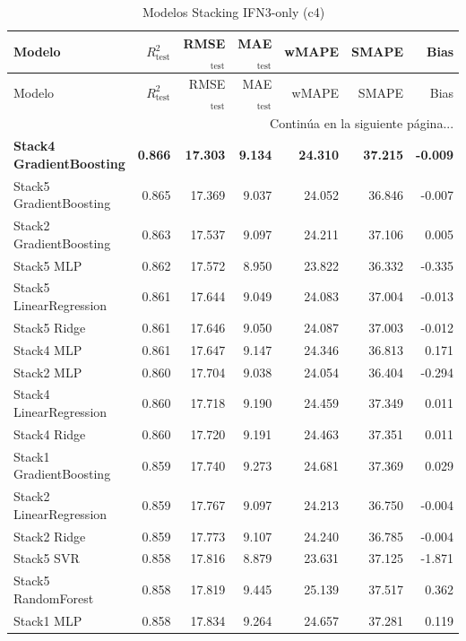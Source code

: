 \begin{longtable}{lrrrrrr}
    \caption{Modelos Stacking IFN3-only (c4)}
    \label{tab:stack_ifn3_c4} \\
    \toprule
    Modelo & $R^2_{\text{test}}$ & RMSE$_{\text{test}}$ & MAE$_{\text{test}}$ & wMAPE & SMAPE & Bias \\
    \midrule
    \endfirsthead
    \toprule
    Modelo & $R^2_{\text{test}}$ & RMSE$_{\text{test}}$ & MAE$_{\text{test}}$ & wMAPE & SMAPE & Bias \\
    \midrule
    \endhead
    \midrule
    \multicolumn{7}{r}{{Continúa en la siguiente página...}} \\
    \endfoot
    \bottomrule
    \endlastfoot
    \textbf{Stack4 GradientBoosting} & \textbf{0.866} & \textbf{17.303} & \textbf{9.134} & \textbf{24.310} & \textbf{37.215} & \textbf{-0.009} \\
    Stack5 GradientBoosting & 0.865 & 17.369 & 9.037 & 24.052 & 36.846 & -0.007 \\
    Stack2 GradientBoosting & 0.863 & 17.537 & 9.097 & 24.211 & 37.106 & 0.005 \\
    Stack5 MLP & 0.862 & 17.572 & 8.950 & 23.822 & 36.332 & -0.335 \\
    Stack5 LinearRegression & 0.861 & 17.644 & 9.049 & 24.083 & 37.004 & -0.013 \\
    Stack5 Ridge & 0.861 & 17.646 & 9.050 & 24.087 & 37.003 & -0.012 \\
    Stack4 MLP & 0.861 & 17.647 & 9.147 & 24.346 & 36.813 & 0.171 \\
    Stack2 MLP & 0.860 & 17.704 & 9.038 & 24.054 & 36.404 & -0.294 \\
    Stack4 LinearRegression & 0.860 & 17.718 & 9.190 & 24.459 & 37.349 & 0.011 \\
    Stack4 Ridge & 0.860 & 17.720 & 9.191 & 24.463 & 37.351 & 0.011 \\
    Stack1 GradientBoosting & 0.859 & 17.740 & 9.273 & 24.681 & 37.369 & 0.029 \\
    Stack2 LinearRegression & 0.859 & 17.767 & 9.097 & 24.213 & 36.750 & -0.004 \\
    Stack2 Ridge & 0.859 & 17.773 & 9.107 & 24.240 & 36.785 & -0.004 \\
    Stack5 SVR & 0.858 & 17.816 & 8.879 & 23.631 & 37.125 & -1.871 \\
    Stack5 RandomForest & 0.858 & 17.819 & 9.445 & 25.139 & 37.517 & 0.362 \\
    Stack1 MLP & 0.858 & 17.834 & 9.264 & 24.657 & 37.281 & 0.119 \\

\end{longtable}
